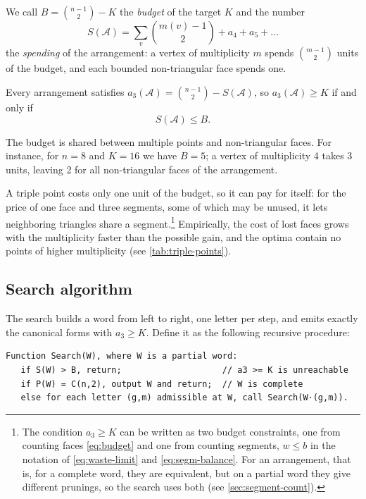 \begin{definition}\label{def:budget}
We call $B=\binom{n-1}2-K$ the \emph{budget} of the target $K$ and the number
\begin{equation}\label{eq:spent}
S(\mathcal A)=\sum_v\binom{m(v)-1}2+a_4+a_5+\ldots
\end{equation}
the \emph{spending} of the arrangement: a vertex of multiplicity $m$ spends $\binom{m-1}2$ units of the budget, and each bounded non-triangular face spends one.
\end{definition}

\begin{corollary}\label{cor:budget}
Every arrangement satisfies $a_3(\mathcal A)=\binom{n-1}2-S(\mathcal A)$, so $a_3(\mathcal A)\ge K$ if and only if
\begin{equation}\label{eq:budget}
S(\mathcal A)\le B .
\end{equation}
\end{corollary}

The budget is shared between multiple points and non-triangular faces.
For instance, for $n=8$ and $K=16$ we have $B=5$; a vertex of multiplicity 4 takes 3 units, leaving 2 for all non-triangular faces of the arrangement.

A triple point costs only one unit of the budget, so it can pay for itself: for the price of one face and three segments, some of which may be unused, it lets neighboring triangles share a segment.\footnote{The condition $a_3\ge K$ can be written as two budget constraints, one from counting faces \eqref{eq:budget} and one from counting segments, $w\le b$ in the notation of \eqref{eq:waste-limit} and \eqref{eq:segm-balance}.
For an arrangement, that is, for a complete word, they are equivalent, but on a partial word they give different prunings, so the search uses both (see \cref{sec:segment-count}).}
Empirically, the cost of lost faces grows with the multiplicity faster than the possible gain, and the optima contain no points of higher multiplicity (see \cref{tab:triple-points}).

\subsection{Search algorithm}\label{sec:search}

The search builds a word from left to right, one letter per step, and
emits exactly the canonical forms with $a_3\ge K$. Define it as the following recursive
procedure:

\begin{verbatim}
Function Search(W), where W is a partial word:
   if S(W) > B, return;                    // a3 >= K is unreachable
   if P(W) = C(n,2), output W and return;  // W is complete
   else for each letter (g,m) admissible at W, call Search(W·(g,m)).
\end{verbatim}

